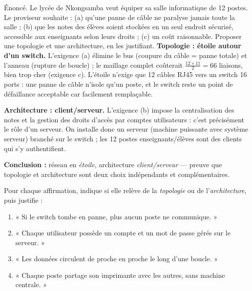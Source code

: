 \documentclass[11pt]{article}
\begin{document}
\begin{exoresolu}
Énoncé. Le lycée de Nkongsamba veut équiper sa salle informatique de 12 postes. Le proviseur souhaite : (a) qu'une panne de câble ne paralyse jamais toute la salle ; (b) que les notes des élèves soient stockées en un seul endroit sécurisé, accessible aux enseignants selon leurs droits ; (c) un coût raisonnable. Proposer une topologie et une architecture, en les justifiant.
\tcblower
\textbf{Topologie : étoile autour d'un switch.} L'exigence (a) élimine le bus (coupure du câble = panne totale) et l'anneau (rupture de boucle) ; le maillage complet coûterait $\frac{12 \times 11}{2} = 66$ liaisons, bien trop cher (exigence c). L'étoile n'exige que 12 câbles RJ45 vers un switch 16 ports : une panne de câble n'isole qu'un poste, et le switch reste un point de défaillance acceptable car facilement remplaçable.

\textbf{Architecture : client/serveur.} L'exigence (b) impose la centralisation des notes et la gestion des droits d'accès par comptes utilisateurs : c'est précisément le rôle d'un serveur. On installe donc un serveur (machine puissante avec système serveur) branché sur le switch ; les 12 postes enseignants/élèves sont des clients qui s'y authentifient.

\textbf{Conclusion :} réseau en \emph{étoile}, architecture \emph{client/serveur} — preuve que topologie et architecture sont deux choix indépendants et complémentaires.
\end{exoresolu}

\begin{exercice}
Pour chaque affirmation, indique si elle relève de la \emph{topologie} ou de l'\emph{architecture}, puis justifie :
\begin{enumerate}
  \item « Si le switch tombe en panne, plus aucun poste ne communique. »
  \item « Chaque utilisateur possède un compte et un mot de passe gérés sur le serveur. »
  \item « Les données circulent de proche en proche le long d'une boucle. »
  \item « Chaque poste partage son imprimante avec les autres, sans machine centrale. »
\end{enumerate}
\end{exercice}
\end{document}
